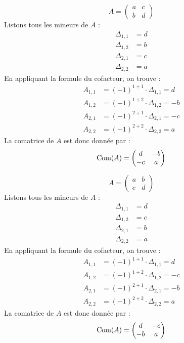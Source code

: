 \documentclass[12pt, a4paper]{report}
\begin{document}
\begin{example}
    $$A = \left(\begin{matrix} a & c \\ b & d \end{matrix}\right)$$
    Listons tous les mineurs de $A$ :
    \begin{align*}
        \Delta_{1,1} &= d \\
        \Delta_{1,2} &= b \\
        \Delta_{2,1} &= c \\
        \Delta_{2,2} &= a
    \end{align*}
    En appliquant la formule du cofacteur, on trouve :
    \begin{align*}
        A_{1,1} &= (-1)^{1+1} \cdot \Delta_{1,1} = d \\
        A_{1,2} &= (-1)^{1+2} \cdot \Delta_{1,2} = -b \\
        A_{2,1} &= (-1)^{2+1} \cdot \Delta_{2,1} = -c \\
        A_{2,2} &= (-1)^{2+2} \cdot \Delta_{2,2} = a
    \end{align*}
    La comatrice de $A$ est donc donnée par :
    $$\mathrm{Com}(A) = \left(\begin{matrix} d & -b \\ -c & a \end{matrix}\right)$$
\end{example}

\begin{example}
    $$A = \left(\begin{matrix} a & b \\ c & d \end{matrix}\right)$$
    Listons tous les mineurs de $A$ :
    \begin{align*}
        \Delta_{1,1} &= d \\
        \Delta_{1,2} &= c \\
        \Delta_{2,1} &= b \\
        \Delta_{2,2} &= a
    \end{align*}
    En appliquant la formule du cofacteur, on trouve :
    \begin{align*}
        A_{1,1} &= (-1)^{1+1} \cdot \Delta_{1,1} = d \\
        A_{1,2} &= (-1)^{1+2} \cdot \Delta_{1,2} = -c \\
        A_{2,1} &= (-1)^{2+1} \cdot \Delta_{2,1} = -b \\
        A_{2,2} &= (-1)^{2+2} \cdot \Delta_{2,2} = a
    \end{align*}
    La comatrice de $A$ est donc donnée par :
    $$\mathrm{Com}(A) = \left(\begin{matrix} d & -c \\ -b & a \end{matrix}\right)$$
\end{example}
\end{document}
